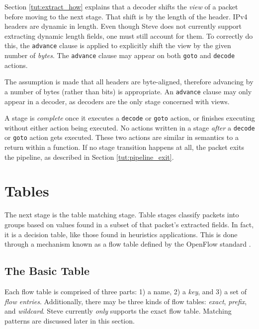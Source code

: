 Section \ref{tut:extract_how} explains that a decoder shifts the
\textit{view} of a packet before moving to the next stage. That shift is by the
length of the header. IPv4 headers are dynamic in length. Even though Steve does not
currently support extracting dynamic length fields, one must still account for
them. To correctly do this, the \texttt{advance} clause is applied to
explicitly shift the view by the given number of \textit{bytes}. The
\texttt{advance} clause may appear on both \texttt{goto} and \texttt{decode} actions.

The assumption is made that all headers are byte-aligned, therefore advancing by
a number of bytes (rather than bits) is appropriate. An
\texttt{advance} clause may only appear in a decoder, as decoders are the only
stage concerned with views.

A stage is \textit{complete} once it executes a \texttt{decode} or \texttt{goto} action, or
finishes executing without either action being executed. No actions written in a stage
\textit{after} a \texttt{decode} or \texttt{goto} action gets executed. These two actions are similar in
semantics to a return within a function. If no stage transition happens at all,
the packet exits the pipeline, as described in Section \ref{tut:pipeline_exit}.

\section{Tables} \label{tut:table}

The next stage is the table matching stage. 
Table stages classify packets into groups based on values found in a subset of that packet's extracted fields. In fact, it is a decision table, like those found in heuristics applications. This is done
through a mechanism known as a flow table defined by the OpenFlow standard
\cite{openflow_spec}.

\subsection{The Basic Table} \label{tut:basic_table}

Each flow table is comprised of three parts: 1) a name, 2) a \textit{key}, and
3) a set of \textit{flow entries}. Additionally, there may be three kinds of
flow tables: \textit{exact}, \textit{prefix}, and \textit{wildcard}. Steve
currently \textit{only} supports the exact flow table. Matching patterns are discussed later in this section.

